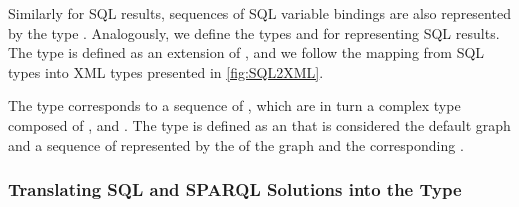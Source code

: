 Similarly for \ac{SQL} results, sequences of \ac{SQL} variable bindings are also represented by the type
.
%
Analogously, we define the types  and  for representing \ac{SQL} results.  The
 type is defined as an extension of , and we follow the mapping from \ac{SQL}
types into \ac{XML} types presented in \cref{fig:SQL2XML}.


The  type corresponds to a sequence of , which are in turn a complex type
composed of ,  and .
%
The  type is defined as an  that is considered the default graph and a sequence of
 represented by the  of the graph and the corresponding .




\subsubsection{Translating SQL and SPARQL Solutions into the  Type}
\label{sec:transl-sql-sparql}

